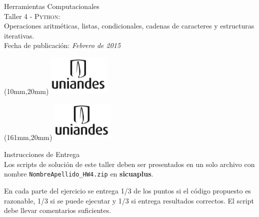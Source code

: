 \documentclass[11pt,letterpaper]{exam}
\begin{document}
\begin{center}
{\Large Herramientas Computacionales} \\
Taller 4 - \textsc{Python}:\\
Operaciones aritméticas, listas, condicionales, \newline cadenas de caracteres y estructuras iterativas. \\
Fecha de publicación: {\small \it Febrero de 2015}\\
\end{center}

\begin{textblock*}{40mm}(10mm,20mm)
  \includegraphics[width=3cm]{logoUniandes.png}
\end{textblock*}

\begin{textblock*}{40mm}(161mm,20mm)
  \includegraphics[width=3cm]{logoUniandes.png}
\end{textblock*}

\vspace{0.5cm}

{\Large Instrucciones de Entrega}\\

Los scripts de solución de este taller deben ser presentados en un solo archivo con nombre \verb+NombreApellido_HW4.zip+ en \textbf{sicuaplus}.

En cada parte del ejercicio se entrega 1/3  de los puntos si el código propuesto es razonable, 1/3 si se puede ejecutar y 1/3 si entrega resultados correctos. El script debe llevar comentarios suficientes.


\vspace{0.5cm}
\end{document}
